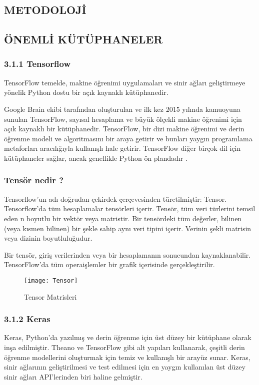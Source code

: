 \documentclass[10pt,a4paper]{report}
\begin{document}
\begin{justify}
	\section{METODOLOJİ}
	
	
	
	\subsection{ÖNEMLİ KÜTÜPHANELER }
	
	
	 \subsubsection*{3.1.1 Tensorflow}
		TensorFlow temelde, makine öğrenimi uygulamaları ve sinir ağları geliştirmeye yönelik Python dostu bir açık kaynaklı kütüphanedir.
	
	Google Brain ekibi tarafından oluşturulan ve ilk kez 2015 yılında kamuoyuna sunulan TensorFlow, sayısal hesaplama ve büyük ölçekli makine öğrenimi için açık kaynaklı bir kütüphanedir. TensorFlow, bir dizi makine öğrenimi ve derin öğrenme modeli ve algoritmasını bir araya getirir ve bunları yaygın programlama metaforları aracılığıyla kullanışlı hale getirir. TensorFlow diğer birçok dil için kütüphaneler sağlar, ancak genellikle Python ön plandadır \cite{yegulalp2024}.
	
	   \subsubsection{Tensör nedir ?}
	   Tensorflow'un adı doğrudan çekirdek çerçevesinden türetilmiştir: Tensor. Tensorflow'da tüm hesaplamalar tensörleri içerir. Tensör, tüm veri türlerini temsil eden n boyutlu bir vektör veya matristir. Bir tensördeki tüm değerler, bilinen (veya kısmen bilinen) bir şekle sahip aynı veri tipini içerir. Verinin şekli matrisin veya dizinin boyutluluğudur.
	   
	   Bir tensör, giriş verilerinden veya bir hesaplamanın sonucundan kaynaklanabilir. TensorFlow'da tüm operaişlemler bir grafik içerisinde gerçekleştirilir\cite{johnson2023}.\newline
	   
	   \begin{figure}[!h]
	   	\centering
	   	\texttt{[image: Tensor]}
	   	\caption{ Tensor Matrisleri \cite{devhunter2018}}
	   	\label{Tensor}
	   \end{figure}
\subsubsection*{3.1.2 Keras}
	Keras, Python'da yazılmış ve derin öğrenme için üst düzey bir kütüphane olarak inşa edilmiştir. Theano ve TensorFlow gibi alt yapıları kullanarak, çeşitli derin öğrenme modellerini oluşturmak için temiz ve kullanışlı bir arayüz sunar. Keras, sinir ağlarının geliştirilmesi ve test edilmesi için en yaygın kullanılan üst düzey sinir ağları API'lerinden biri haline gelmiştir.\newline
	

\end{justify}
\end{document}
